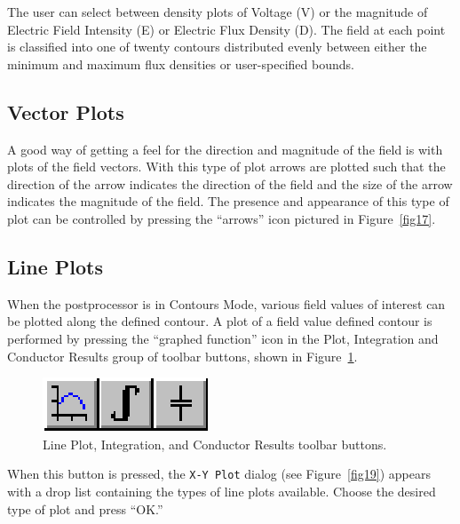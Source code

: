 \documentclass[12pt]{report}
\begin{document}
The user can select between density plots of Voltage (V) or the magnitude of
Electric Field Intensity (E) or Electric Flux Density (D). The field at each
point is classified into one of twenty contours distributed evenly between
either the minimum and maximum flux densities or user-specified bounds.

\subsection{Vector Plots}

A good way of getting a feel for the direction and magnitude of the
field is with plots of the field vectors. With this type of plot
arrows are plotted such that the direction of the arrow indicates
the direction of the field and the size of the arrow indicates the
magnitude of the field. The presence and appearance of this type of
plot can be controlled by pressing the ``arrows'' icon pictured in
Figure~\ref{fig17}.

\subsection{Line Plots}

When the postprocessor is in Contours Mode, various field values of
interest can be plotted along the defined contour. A plot of a
field value defined contour is performed by pressing the ``graphed
function'' icon in the Plot, Integration and Conductor Results group of toolbar
buttons, shown in Figure~\ref{fig18}.

\begin{figure}[htbp]
\centerline{\includegraphics{belaman18.eps}}
\caption{Line Plot, Integration, and Conductor Results toolbar buttons.}
\label{fig18}
\end{figure}


When this button is pressed, the \texttt{X-Y Plot} dialog (see
Figure~\ref{fig19}) appears with a drop list containing the types
of line plots available. Choose the desired type of plot and press
``OK.''
\end{document}
